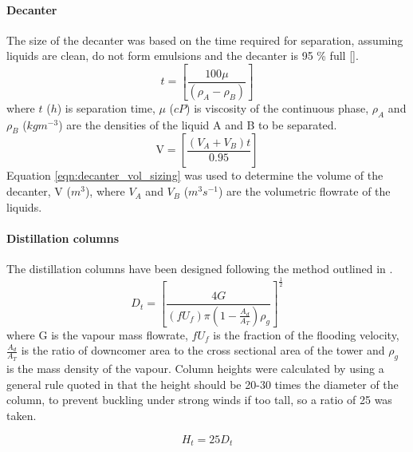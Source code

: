 \paragraph{Decanter}
The size of the decanter was based on the time required for separation, assuming liquids are clean, do not form emulsions and the decanter is 95 \% full [].  
\begin{equation}
    t = \left[\frac{100\mu}{(\rho_A - \rho_B)}\right]
    \label{eqn:decanter_time_sizing}
\end{equation}
where $t$ ($h$) is separation time, $\mu$ ($cP$) is viscosity of the continuous phase, $\rho_A$ and $\rho_B$ ($kgm^{-3}$) are the densities of the liquid A and B to be separated. 
\begin{equation}
    \text{V} = \left[\frac{(V_A + V_B)t}{0.95}\right] 
    \label{eqn:decanter_vol_sizing}
\end{equation}
Equation \ref{eqn:decanter_vol_sizing} was used to determine the volume of the decanter, V ($m^3$), where $V_A$ and $V_B$ ($m^3s^{-1}$)  are the volumetric flowrate of the liquids. 

\paragraph{Distillation columns}
The distillation columns have been designed following the method outlined in \textcite{seider_product_2009}.
\begin{equation}
    D_t = \left[\frac{4G}{(fU_f)\pi\left(1-\frac{A_d}{A_T}\right)\rho_g}\right]^\frac{1}{2}
    \label{distill_dia_sizing}
\end{equation}
where G is the vapour mass flowrate, $fU_f$ is the fraction of the flooding velocity, $\frac{A_d}{A_T}$ is the ratio of downcomer area to the cross sectional area of the tower and $\rho_g$ is the mass density of the vapour. Column heights were calculated by using a general rule quoted in \textcite{douglas_conceptual_1988} that the height should be 20-30 times the diameter of the column, to prevent buckling under strong winds if too tall, so a ratio of 25 was taken. 

\begin{equation}
    H_t = 25D_t
    \label{distill_height_sizing}
\end{equation}

